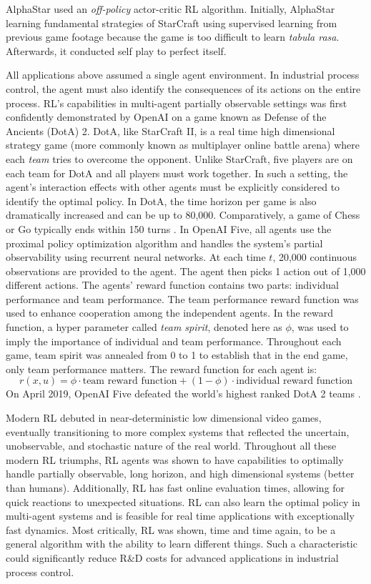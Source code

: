 AlphaStar used an \textit{off-policy} actor-critic RL algorithm. Initially, AlphaStar learning fundamental strategies of StarCraft using supervised learning from previous game footage because the game is too difficult to learn \textit{tabula rasa}.  Afterwards, it conducted self play to perfect itself.

All applications above assumed a single agent environment.  In industrial process control, the agent must also identify the consequences of its actions on the entire process. RL's capabilities in multi-agent partially observable settings was first confidently demonstrated by OpenAI on a game known as Defense of the Ancients (DotA) 2. DotA, like StarCraft II, is a real time high dimensional strategy game (more commonly known as multiplayer online battle arena) where each \textit{team} tries to overcome the opponent. Unlike StarCraft, five players are on each team for DotA and all players must work together. In such a setting, the agent's interaction effects with other agents must be explicitly considered to identify the optimal policy. In DotA, the time horizon per game is also dramatically increased and can be up to 80,000. Comparatively, a game of Chess or Go typically ends within 150 turns \cite{openai}. In OpenAI Five, all agents use the proximal policy optimization algorithm and handles the system's partial observability using recurrent neural networks. At each time $t$, 20,000 continuous observations are provided to the agent.  The agent then picks 1 action out of 1,000 different actions. The agents' reward function contains two parts: individual performance and team performance. The team performance reward function was used to enhance cooperation among the independent agents.  In the reward function, a hyper parameter called \textit{team spirit}, denoted here as $\phi$, was used to imply the importance of individual and team performance.  Throughout each game, team spirit was annealed from 0 to 1 to establish that in the end game, only team performance matters. The reward function for each agent is:
\begin{equation}
    r(x, u) = \phi \cdot \text{team reward function} + (1 - \phi) \cdot \text{individual reward function}
\end{equation}
On April 2019, OpenAI Five defeated the world's highest ranked DotA 2 teams \cite{openai2}.

Modern RL debuted in near-deterministic low dimensional video games, eventually transitioning to more complex systems that reflected the uncertain, unobservable, and stochastic nature of the real world.  Throughout all these modern RL triumphs, RL agents was shown to have capabilities to optimally handle partially observable, long horizon, and high dimensional systems (better than humans).  Additionally, RL has fast online evaluation times, allowing for quick reactions to unexpected situations.  RL can also learn the optimal policy in multi-agent systems and is feasible for real time applications with exceptionally fast dynamics. Most critically, RL was shown, time and time again, to be a general algorithm with the ability to learn different things. Such a characteristic could significantly reduce R\&D costs for advanced applications in industrial process control.



